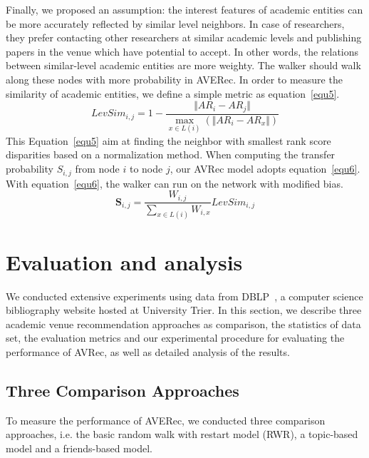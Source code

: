 \documentclass[9pt]{acm_proc_article-sp}
\begin{document}
Finally, we proposed an assumption: the interest features of academic entities can be more accurately reflected by similar level neighbors. In case of researchers, they prefer contacting other researchers at similar academic levels and publishing papers in the venue which have potential to accept. In other words, the relations between similar-level academic entities are more weighty. The walker should walk along these nodes with more probability in AVERec. In order to measure the similarity of academic entities, we define a simple metric as equation~\ref{equ5}.
\begin{equation}
\label{equ5}
LevSim_{i,j}=1-\frac{\Vert AR_{i}-AR_{j}\Vert}{\max_{x\in L(i)}(\Vert AR_{i}-AR_{x}\Vert)}
\end{equation}
This Equation~\ref{equ5} aim at finding the neighbor with smallest rank score disparities based on a normalization method. When computing the transfer probability $S_{i,j}$ from node $i$ to node $j$, our AVRec model adopts equation~\ref{equ6}. With equation~\ref{equ6}, the walker can run on the network with modified bias.
\begin{equation}
\label{equ6}
\mathbf{S}_{i,j}=\frac{W_{i,j}}{\sum_{x\in L(i)}W_{i,x}}LevSim_{i,j}
\end{equation}

\section{Evaluation and analysis}
\label{section:evaluation}
We conducted extensive experiments using data from DBLP~\cite{Ley:DBLP}, a computer science bibliography website hosted at University Trier. In this section, we describe three academic venue recommendation approaches as comparison, the statistics of data set, the evaluation metrics and our experimental procedure for evaluating the performance of AVRec, as well as detailed analysis of the results.

\subsection{Three Comparison Approaches}
To measure the performance of AVERec, we conducted three comparison approaches, i.e. the basic random walk with restart model (RWR), a topic-based model and a friends-based model.
\end{document}
